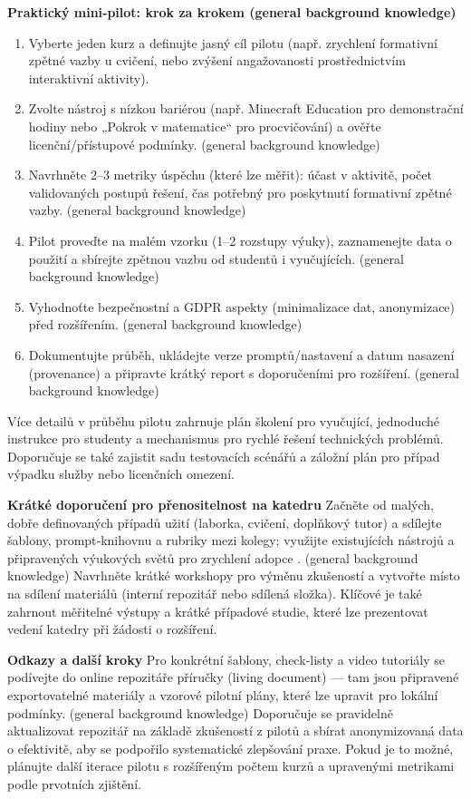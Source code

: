\bigskip
\noindent \textbf{Praktický mini‑pilot: krok za krokem (general background knowledge)}
\begin{enumerate}
  \item Vyberte jeden kurz a definujte jasný cíl pilotu (např. zrychlení formativní zpětné vazby u cvičení, nebo zvýšení angažovanosti prostřednictvím interaktivní aktivity).
  \item Zvolte nástroj s nízkou bariérou (např. Minecraft Education pro demonstrační hodiny nebo „Pokrok v matematice“ pro procvičování) a ověřte licenční/přístupové podmínky. (general background knowledge)
  \item Navrhněte 2–3 metriky úspěchu (které lze měřit): účast v aktivitě, počet validovaných postupů řešení, čas potřebný pro poskytnutí formativní zpětné vazby. (general background knowledge)
  \item Pilot proveďte na malém vzorku (1–2 rozstupy výuky), zaznamenejte data o použití a sbírejte zpětnou vazbu od studentů i vyučujících. (general background knowledge)
  \item Vyhodnoťte bezpečnostní a GDPR aspekty (minimalizace dat, anonymizace) před rozšířením. (general background knowledge)
  \item Dokumentujte průběh, ukládejte verze promptů/nastavení a datum nasazení (provenance) a připravte krátký report s doporučeními pro rozšíření. (general background knowledge)
\end{enumerate}
Více detailů v průběhu pilotu zahrnuje plán školení pro vyučující, jednoduché instrukce pro studenty a mechanismus pro rychlé řešení technických problémů.
Doporučuje se také zajistit sadu testovacích scénářů a záložní plán pro případ výpadku služby nebo licenčních omezení.

\bigskip
\noindent \textbf{Krátké doporučení pro přenositelnost na katedru}  
Začněte od malých, dobře definovaných případů užití (laborka, cvičení, doplňkový tutor) a sdílejte šablony, prompt‑knihovnu a rubriky mezi kolegy; využijte existujících nástrojů a připravených výukových světů pro zrychlení adopce \cite{kb_ai_101_tipu_pdf_04e4a115_page_15_2,kb_ai_101_tipu_pdf_04e4a115_page_8_1}. (general background knowledge)
Navrhněte krátké workshopy pro výměnu zkušeností a vytvořte místo na sdílení materiálů (interní repozitář nebo sdílená složka).
Klíčové je také zahrnout měřitelné výstupy a krátké případové studie, které lze prezentovat vedení katedry při žádosti o rozšíření.

\bigskip
\noindent \textbf{Odkazy a další kroky}  
Pro konkrétní šablony, check‑listy a video tutoriály se podívejte do online repozitáře příručky (living document) — tam jsou připravené exportovatelné materiály a vzorové pilotní plány, které lze upravit pro lokální podmínky. (general background knowledge)
Doporučuje se pravidelně aktualizovat repozitář na základě zkušeností z pilotů a sbírat anonymizovaná data o efektivitě, aby se podpořilo systematické zlepšování praxe.
Pokud je to možné, plánujte další iterace pilotu s rozšířeným počtem kurzů a upravenými metrikami podle prvotních zjištění.